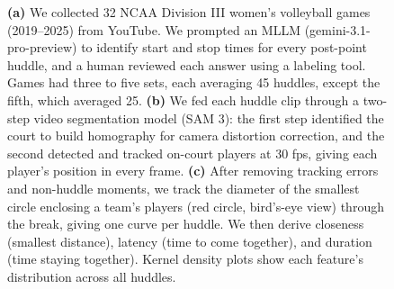 \begin{figure}[H]
{%
}
\caption{\textbf{(a)} We collected 32 NCAA Division III women’s volleyball games (2019–2025) from YouTube. We prompted an MLLM (gemini-3.1-pro-preview) to identify start and stop times for every post-point huddle, and a human reviewed each answer using a labeling tool. Games had three to five sets, each averaging 45 huddles, except the fifth, which averaged 25. \textbf{(b)} We fed each huddle clip through a two-step video segmentation model (SAM 3): the first step identified the court to build homography for camera distortion correction, and the second detected and tracked on-court players at 30 fps, giving each player’s position in every frame. \textbf{(c)} After removing tracking errors and non-huddle moments, we track the diameter of the smallest circle enclosing a team’s players (red circle, bird’s-eye view) through the break, giving one curve per huddle. We then derive closeness (smallest distance), latency (time to come together), and duration (time staying together). Kernel density plots show each feature’s distribution across all huddles.}
%
\label{fig:pipeline}
\end{figure}
